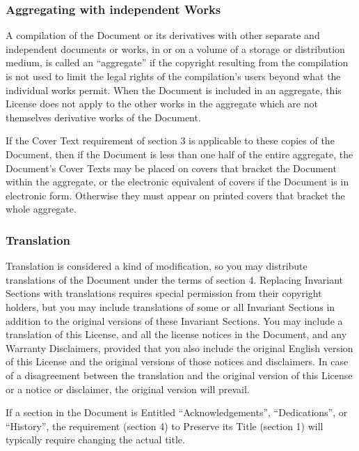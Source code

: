 \documentclass{article}
\begin{document}
\subsubsection{Aggregating with independent Works}

A compilation of the Document or its derivatives with other separate
and independent documents or works, in or on a volume of a storage or
distribution medium, is called an ``aggregate'' if the copyright
resulting from the compilation is not used to limit the legal rights
of the compilation's users beyond what the individual works permit.
When the Document is included in an aggregate, this License does not
apply to the other works in the aggregate which are not themselves
derivative works of the Document.

If the Cover Text requirement of section 3 is applicable to these
copies of the Document, then if the Document is less than one half of
the entire aggregate, the Document's Cover Texts may be placed on
covers that bracket the Document within the aggregate, or the
electronic equivalent of covers if the Document is in electronic form.
Otherwise they must appear on printed covers that bracket the whole
aggregate.



\subsubsection{Translation}

Translation is considered a kind of modification, so you may
distribute translations of the Document under the terms of section 4.
Replacing Invariant Sections with translations requires special
permission from their copyright holders, but you may include
translations of some or all Invariant Sections in addition to the
original versions of these Invariant Sections.  You may include a
translation of this License, and all the license notices in the
Document, and any Warranty Disclaimers, provided that you also include
the original English version of this License and the original versions
of those notices and disclaimers.  In case of a disagreement between
the translation and the original version of this License or a notice
or disclaimer, the original version will prevail.

If a section in the Document is Entitled ``Acknowledgements'',
``Dedications'', or ``History'', the requirement (section 4) to Preserve
its Title (section 1) will typically require changing the actual
title.
\end{document}
